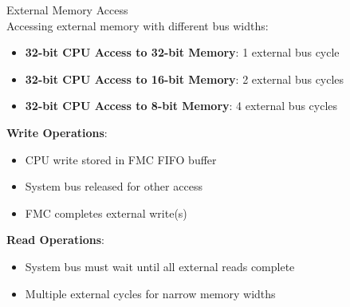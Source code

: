 \begin{concept}{External Memory Access}\\
Accessing external memory with different bus widths:
\begin{itemize}
    \item \textbf{32-bit CPU Access to 32-bit Memory}: 1 external bus cycle
    \item \textbf{32-bit CPU Access to 16-bit Memory}: 2 external bus cycles
    \item \textbf{32-bit CPU Access to 8-bit Memory}: 4 external bus cycles
\end{itemize}
\textbf{Write Operations}:
\begin{itemize}
    \item CPU write stored in FMC FIFO buffer
    \item System bus released for other access
    \item FMC completes external write(s)
\end{itemize}
\textbf{Read Operations}:
\begin{itemize}
    \item System bus must wait until all external reads complete
    \item Multiple external cycles for narrow memory widths
\end{itemize}
\end{concept}


